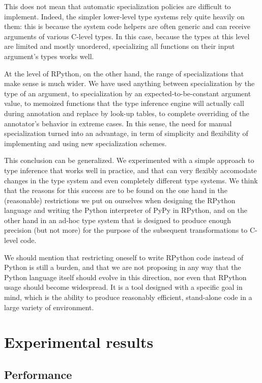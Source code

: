\documentclass{acm_proc_article-sp}
\begin{document}
This does not mean that automatic specialization policies are difficult
to implement.  Indeed, the simpler lower-level type systems rely quite
heavily on them: this is because the system code helpers are often
generic and can receive arguments of various C-level types.  In this
case, because the types at this level are limited and mostly unordered,
specializing all functions on their input argument's types works well.

At the level of RPython, on the other hand, the range of specializations
that make sense is much wider.  We have used anything between
specialization by the type of an argument, to specialization by an
expected-to-be-constant argument value, to memoized functions that the
type inference engine will actually call during annotation and replace
by look-up tables, to complete overriding of the annotator's behavior in
extreme cases.  In this sense, the need for manual specialization turned
into an advantage, in term of simplicity and flexibility of implementing
and using new specialization schemes.

This conclusion can be generalized.  We experimented with a simple
approach to type inference that works well in practice, and that can
very flexibly accomodate changes in the type system and even completely
different type systems.  We think that the reasons for this success are
to be found on the one hand in the (reasonable) restrictions we put on
ourselves when designing the RPython language and writing the Python
interpreter of PyPy in RPython, and on the other hand in an ad-hoc type
system that is designed to produce enough precision (but not more) for
the purpose of the subsequent transformations to C-level code.

We should mention that restricting oneself to write RPython code instead
of Python is still a burden, and that we are not proposing in any way
that the Python language itself should evolve in this direction, nor
even that RPython usage should become widespread.  It is a tool designed
with a specific goal in mind, which is the ability to produce reasonably
efficient, stand-alone code in a large variety of environment.



\section{Experimental results}
\label{experimentalresults}


\subsection{Performance}
\end{document}
